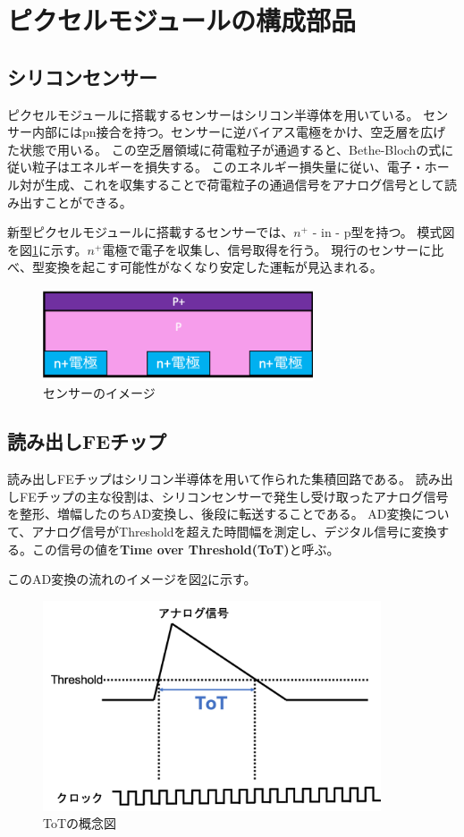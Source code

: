 \section{ピクセルモジュールの構成部品}
\subsection{シリコンセンサー}
ピクセルモジュールに搭載するセンサーはシリコン半導体を用いている。
センサー内部にはpn接合\cite{2-1}を持つ。センサーに逆バイアス電極をかけ、空乏層\cite{2-1}を広げた状態で用いる。
この空乏層領域に荷電粒子が通過すると、Bethe-Blochの式\cite{2-1}に従い粒子はエネルギーを損失する。
このエネルギー損失量に従い、電子・ホール対が生成、これを収集することで荷電粒子の通過信号をアナログ信号として読み出すことができる。

新型ピクセルモジュールに搭載するセンサーでは、$n^+$ - in - p型を持つ。
模式図を図\ref{sensor_image}に示す。$n^+$電極で電子を収集し、信号取得を行う。
現行のセンサーに比べ、型変換を起こす可能性がなくなり安定した運転が見込まれる。\cite{1-3}

\begin{figure}[bpt]\centering
\includegraphics[width=8cm]{sensor_image}
\caption[センサーのイメージ]{センサーのイメージ}
\label{sensor_image}
\end{figure}

\subsection{読み出しFEチップ}
読み出しFEチップはシリコン半導体を用いて作られた集積回路である。
読み出しFEチップの主な役割は、シリコンセンサーで発生し受け取ったアナログ信号を整形、増幅したのちAD変換し、後段に転送することである。
AD変換について、アナログ信号がThresholdを超えた時間幅を測定し、デジタル信号に変換する。この信号の値を\textbf{Time over Threshold(ToT)}と呼ぶ。

このAD変換の流れのイメージを図\ref{tot_algorithm}に示す。

\begin{figure}[bpt]\centering
\includegraphics[width=10cm]{tot_algorithm}
\caption[ToTの概念図]{ToTの概念図}
\label{tot_algorithm}
\end{figure}



